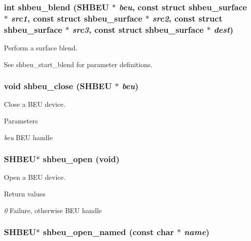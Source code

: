 \subsubsection[{shbeu\_\-blend}]{\setlength{\rightskip}{0pt plus 5cm}int shbeu\_\-blend (SHBEU $\ast$ {\em beu}, \/  const struct {\bf shbeu\_\-surface} $\ast$ {\em src1}, \/  const struct {\bf shbeu\_\-surface} $\ast$ {\em src2}, \/  const struct {\bf shbeu\_\-surface} $\ast$ {\em src3}, \/  const struct {\bf shbeu\_\-surface} $\ast$ {\em dest})}\label{shbeu_8h_a88c5462e8fa15ae971aedc4b0d3cf8a9}


Perform a surface blend. 

See shbeu\_\-start\_\-blend for parameter definitions. 
\subsubsection[{shbeu\_\-close}]{\setlength{\rightskip}{0pt plus 5cm}void shbeu\_\-close (SHBEU $\ast$ {\em beu})}\label{shbeu_8h_a5c585dfa08b71cfb9e86e85e55174ca2}


Close a BEU device. 


\begin{DoxyParams}{Parameters}
\item[{\em beu}]BEU handle \end{DoxyParams}
\subsubsection[{shbeu\_\-open}]{\setlength{\rightskip}{0pt plus 5cm}SHBEU$\ast$ shbeu\_\-open (void)}\label{shbeu_8h_a0d3c9f7b67d242079cf0276417f39f0a}


Open a BEU device. 


\begin{DoxyRetVals}{Return values}
\item[{\em 0}]Failure, otherwise BEU handle \end{DoxyRetVals}
\subsubsection[{shbeu\_\-open\_\-named}]{\setlength{\rightskip}{0pt plus 5cm}SHBEU$\ast$ shbeu\_\-open\_\-named (const char $\ast$ {\em name})}\label{shbeu_8h_a1e7ca2bb54f90ba867519a78c6829f0d}


